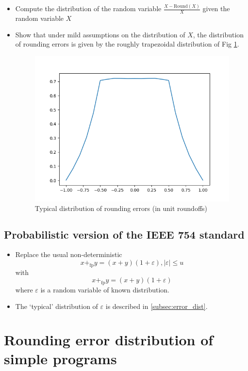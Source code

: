 \documentclass[10pt,conference]{IEEEtran}
\newcommand{\round}{\mathrm{Round}}
\newcommand{\pfp}{+_{\mathrm{fp}}}
\newcommand{\absv}[1]{\vert #1\vert}
\begin{document}
\begin{itemize}
\item Compute the distribution of the random variable $\frac{X-\round(X)}{X}$ given the random variable $X$
\item Show that under mild assumptions on the distribution of $X$, the distribution of rounding errors is given by the roughly trapezoidal distribution of Fig \ref{fig:trapeze}.
\begin{figure}[h!]
\includegraphics[scale=0.6]{trapeze_dist}
\caption{Typical distribution of rounding errors (in unit roundoffs)}
\label{fig:trapeze}
\end{figure}
\end{itemize}

\subsection{Probabilistic version of the IEEE 754 standard}\label{subsec:prob_ieee754}

\begin{itemize}
\item Replace the usual non-deterministic 
\[
x\pfp y=(x+y)(1+\varepsilon), \absv{\varepsilon}\leq u
\]
with
\[
x\pfp y=(x+y)(1+\varepsilon)
\]
where $\varepsilon$ is a random variable of known distribution.
\item The `typical' distribution of $\varepsilon$ is described in \cref{subsec:error_dist}.
\end{itemize}

\section{Rounding error distribution of simple programs}
\end{document}
